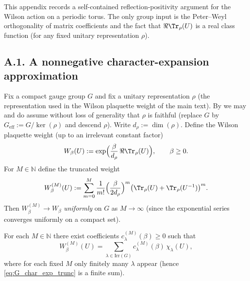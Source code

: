

This appendix records a self-contained reflection-positivity argument for the Wilson action on a periodic torus.
The only group input is the Peter--Weyl orthogonality of matrix coefficients and the fact that
$\Re\Tr_{\rho}(U)$ is a real class function (for any fixed unitary representation $\rho$).

\subsection*{A.1. A nonnegative character-expansion approximation}

Fix a compact gauge group $G$ and fix a unitary representation $\rho$ (the representation used in the Wilson plaquette weight of the main text).
By  we may and do assume without loss of generality that $\rho$ is faithful
(replace $G$ by $G_{\mathrm{eff}}:=G/\ker(\rho)$ and descend $\rho$).
Write $d_\rho:=\dim(\rho)$.
Define the Wilson plaquette weight (up to an irrelevant constant factor)
\begin{equation}\label{eq:Wilson_weight_def_appA}
W_\beta(U):=\exp\!\Big(\frac{\beta}{d_\rho}\,\Re\Tr_{\rho}(U)\Big),\qquad \beta\ge 0.
\end{equation}
For $M\in\mathbb N$ define the truncated weight
\begin{equation}\label{eq:Wilson_weight_trunc}
W_{\beta}^{(M)}(U)
:=\sum_{m=0}^{M}\frac{1}{m!}\Big(\frac{\beta}{2d_\rho}\Big)^{m}\big(\Tr_{\rho}(U)+\Tr_{\rho}(U^{-1})\big)^{m}.
\end{equation}
Then $W_{\beta}^{(M)}\to W_\beta$ \emph{uniformly} on $G$ as $M\to\infty$ (since the exponential series converges uniformly on a compact set).

\begin{lemma}\label{lem:char_exp_G}
For each $M\in\mathbb N$ there exist coefficients $c^{(M)}_{\lambda}(\beta)\ge 0$ such that
\begin{equation}\label{eq:G_char_exp_trunc}
W_{\beta}^{(M)}(U)
=\sum_{\lambda\in\mathrm{Irr}(G)} c^{(M)}_{\lambda}(\beta)\,\chi_{\lambda}(U),
\end{equation}
where for each fixed $M$ only finitely many $\lambda$ appear (hence \eqref{eq:G_char_exp_trunc} is a finite sum).
\end{lemma}


